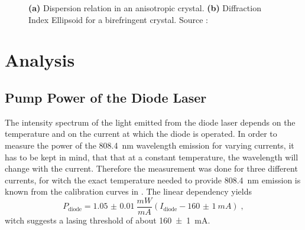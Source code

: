 \documentclass[a4paper]{scrartcl}
\numberwithin{equation}{section}
\numberwithin{figure}{section}
\numberwithin{table}{section}
\newcommand{\eq}[2]{\begin{equation}#1\label{#2}\end{equation}}
\begin{document}
\begin{figure}
\centering
{}
\hfill
{}
\caption{\small \textbf{(a)} Dispersion relation in an anisotropic crystal. \textbf{(b)} Diffraction Index Ellipsoid for a birefringent crystal. Source : \cite{dickel}}
\label{fig:nonlinearofoptics}
\end{figure}

\section{Analysis}
\subsection{Pump Power of the Diode Laser}
The intensity spectrum of the light emitted from the diode laser depends on the temperature and on the current at which the diode is operated. In order to measure the power of the \SI{808.4}{nm} wavelength emission for varying currents, it has to be kept in mind, that that at a constant temperature, the wavelength will change with the current. Therefore the measurement was done for three different currents, for witch the exact temperature needed to provide \SI{808.4}{nm} emission is known from the calibration curves in \cite{script}. The linear dependency yields \eq{P_\text{diode}=\SI{1.05(1)}{\frac{mW}{mA}}\left(I_\text{diode}-\SI{160(1)}{mA} \right) \;, }{cal}
witch suggests a lasing threshold of about \SI{160(1)}{mA}. 
\end{document}
